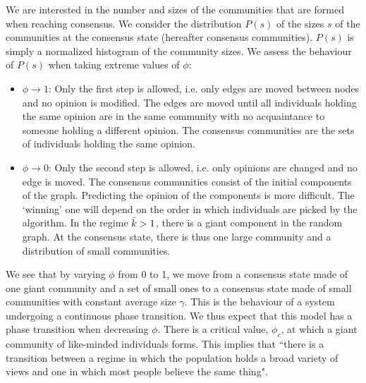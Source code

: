 \documentclass[11pt]{article}
\begin{document}
We are interested in the number and sizes of the communities that are formed when reaching consensus. We consider the distribution $P(s)$ of the sizes $s$ of the communities at the consensus state (hereafter consensus communities). $P(s)$ is simply a normalized histogram of the community sizes. We assess the behaviour of $P(s)$ when taking extreme values of $\phi$:
\begin{itemize}
    \item $\phi\rightarrow 1$: Only the first step is allowed, i.e. only edges are moved between nodes and no opinion is modified. The edges are moved until all individuals holding the same opinion are in the same community with no acquaintance to someone holding a different opinion. The consensus communities are the sets of individuals holding the same opinion.  
    \item $\phi\rightarrow 0$: Only the second step is allowed, i.e. only opinions are changed and no edge is moved. The consensus communities consist of the initial components of the graph. Predicting the opinion of the components is more difficult. The `winning' one will depend on the order in which individuals are picked by the algorithm. In the regime $\Bar{k}>1$, there is a giant component in the random graph. At the consensus state, there is thus one large community and a distribution of small communities.
\end{itemize}
We see that by varying $\phi$ from 0 to 1, we move from a consensus state made of one giant community and a set of small ones to a consensus state made of small communities with constant average size $\gamma$. This is the behaviour of a system undergoing a continuous phase transition. We thus expect that this model has a phase transition when decreasing $\phi$. There is a critical value, $\phi_c$, at which a giant community of like-minded individuals forms. This implies that ``there is a transition between a regime in which the population holds a broad variety of views and one in which most people believe the same thing".  
\end{document}
